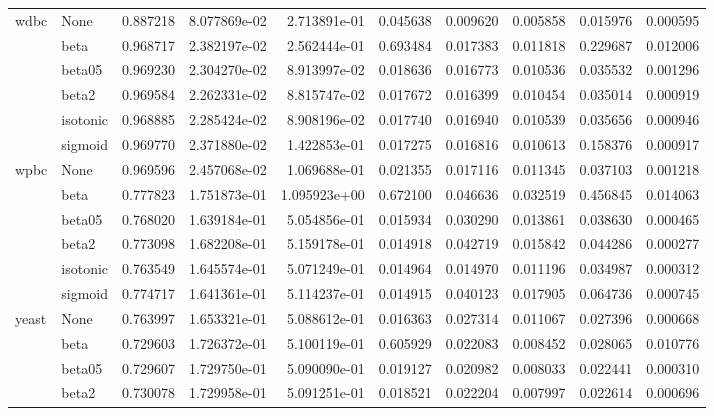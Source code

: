 \begin{tabular}{llrrrrrrrr}
wdbc & None &  0.887218 &  8.077869e-02 &  2.713891e-01 &   0.045638 &  0.009620 &  0.005858 &  0.015976 &  0.000595 \\
        & beta &  0.968717 &  2.382197e-02 &  2.562444e-01 &   0.693484 &  0.017383 &  0.011818 &  0.229687 &  0.012006 \\
        & beta05 &  0.969230 &  2.304270e-02 &  8.913997e-02 &   0.018636 &  0.016773 &  0.010536 &  0.035532 &  0.001296 \\
        & beta2 &  0.969584 &  2.262331e-02 &  8.815747e-02 &   0.017672 &  0.016399 &  0.010454 &  0.035014 &  0.000919 \\
        & isotonic &  0.968885 &  2.285424e-02 &  8.908196e-02 &   0.017740 &  0.016940 &  0.010539 &  0.035656 &  0.000946 \\
        & sigmoid &  0.969770 &  2.371880e-02 &  1.422853e-01 &   0.017275 &  0.016816 &  0.010613 &  0.158376 &  0.000917 \\
wpbc & None &  0.969596 &  2.457068e-02 &  1.069688e-01 &   0.021355 &  0.017116 &  0.011345 &  0.037103 &  0.001218 \\
        & beta &  0.777823 &  1.751873e-01 &  1.095923e+00 &   0.672100 &  0.046636 &  0.032519 &  0.456845 &  0.014063 \\
        & beta05 &  0.768020 &  1.639184e-01 &  5.054856e-01 &   0.015934 &  0.030290 &  0.013861 &  0.038630 &  0.000465 \\
        & beta2 &  0.773098 &  1.682208e-01 &  5.159178e-01 &   0.014918 &  0.042719 &  0.015842 &  0.044286 &  0.000277 \\
        & isotonic &  0.763549 &  1.645574e-01 &  5.071249e-01 &   0.014964 &  0.014970 &  0.011196 &  0.034987 &  0.000312 \\
        & sigmoid &  0.774717 &  1.641361e-01 &  5.114237e-01 &   0.014915 &  0.040123 &  0.017905 &  0.064736 &  0.000745 \\
yeast & None &  0.763997 &  1.653321e-01 &  5.088612e-01 &   0.016363 &  0.027314 &  0.011067 &  0.027396 &  0.000668 \\
        & beta &  0.729603 &  1.726372e-01 &  5.100119e-01 &   0.605929 &  0.022083 &  0.008452 &  0.028065 &  0.010776 \\
        & beta05 &  0.729607 &  1.729750e-01 &  5.090090e-01 &   0.019127 &  0.020982 &  0.008033 &  0.022441 &  0.000310 \\
        & beta2 &  0.730078 &  1.729958e-01 &  5.091251e-01 &   0.018521 &  0.022204 &  0.007997 &  0.022614 &  0.000696 \\

\end{tabular}
